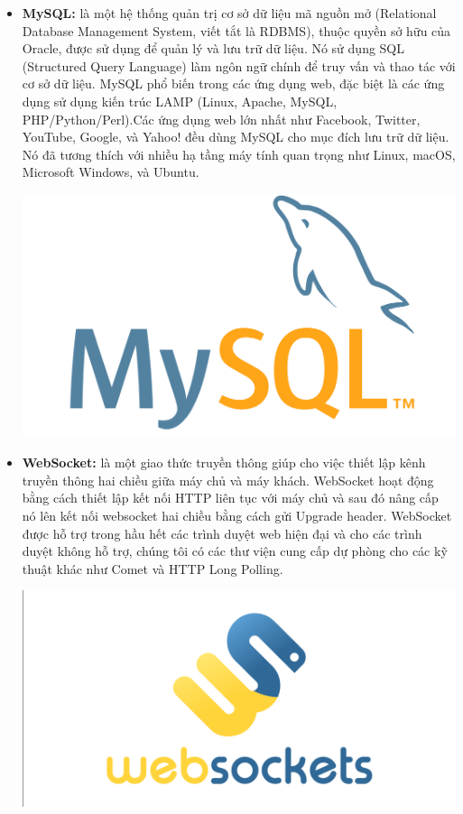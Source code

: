 \begin{itemize}
    \item \textbf{MySQL:} là một hệ thống quản trị cơ sở dữ liệu mã nguồn mở (Relational Database Management System, viết tắt là RDBMS), thuộc quyền sở hữu của Oracle, được sử dụng để quản lý và lưu trữ dữ liệu. Nó sử dụng SQL (Structured Query Language) làm ngôn ngữ chính để truy vấn và thao tác với cơ sở dữ liệu. MySQL phổ biến trong các ứng dụng web, đặc biệt là các ứng dụng sử dụng kiến trúc LAMP (Linux, Apache, MySQL, PHP/Python/Perl).Các ứng dụng web lớn nhất như Facebook, Twitter, YouTube, Google, và Yahoo! đều dùng MySQL cho mục đích lưu trữ dữ liệu. Nó đã tương thích với nhiều hạ tầng máy tính quan trọng như Linux, macOS, Microsoft Windows, và Ubuntu.

    \includegraphics[width=\textwidth]{img/mysql.png}
\end{itemize}

\begin{itemize}
    \item \textbf{WebSocket:} là một giao thức truyền thông giúp cho việc thiết lập kênh truyền thông hai chiều giữa máy chủ và máy khách. WebSocket hoạt động bằng cách thiết lập kết nối HTTP liên tục với máy chủ và sau đó nâng cấp nó lên kết nối websocket hai chiều bằng cách gửi Upgrade header. WebSocket được hỗ trợ trong hầu hết các trình duyệt web hiện đại và cho các trình duyệt không hỗ trợ, chúng tôi có các thư viện cung cấp dự phòng cho các kỹ thuật khác như Comet và HTTP Long Polling.

    \includegraphics[width=\textwidth]{img/websocket.png}
\end{itemize}

